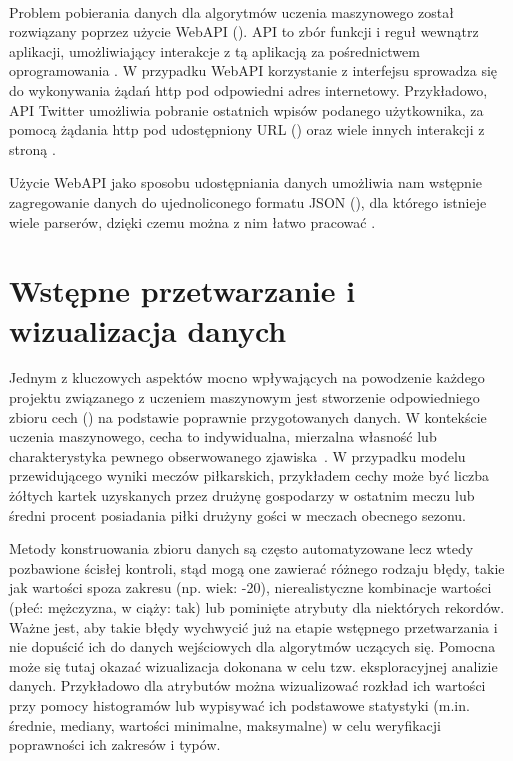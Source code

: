 ~

Problem pobierania danych dla algorytmów uczenia maszynowego został rozwiązany poprzez użycie WebAPI (). API to zbór funkcji i reguł wewnątrz aplikacji, umożliwiający interakcje z tą aplikacją za pośrednictwem oprogramowania \cite{webAPI_Mozzila}. W przypadku WebAPI korzystanie z interfejsu sprowadza się do wykonywania żądań http pod odpowiedni adres internetowy. Przykładowo, API Twitter umożliwia pobranie ostatnich wpisów podanego użytkownika, za pomocą żądania http pod udostępniony URL () oraz wiele innych interakcji z stroną \cite{Twitter_API}.

Użycie WebAPI jako sposobu udostępniania danych umożliwia nam wstępnie zagregowanie danych do ujednoliconego formatu JSON (), dla którego istnieje wiele parserów, dzięki czemu można z nim łatwo pracować \cite{JsonParserPython}.

\section{Wstępne przetwarzanie i wizualizacja danych}

\noindent 

Jednym z kluczowych aspektów mocno wpływających na powodzenie każdego projektu związanego z uczeniem maszynowym jest stworzenie odpowiedniego zbioru cech () na podstawie poprawnie przygotowanych danych. W kontekście uczenia maszynowego, cecha to indywidualna, mierzalna własność lub charakterystyka pewnego obserwowanego zjawiska~\cite{Wiki:Feature}. W przypadku modelu przewidującego wyniki meczów piłkarskich, przykładem cechy może być liczba żółtych kartek uzyskanych przez drużynę gospodarzy w ostatnim meczu lub średni procent posiadania piłki drużyny gości w meczach obecnego sezonu.

Metody konstruowania zbioru danych są często automatyzowane lecz wtedy  pozbawione ścisłej kontroli, stąd mogą one zawierać różnego rodzaju błędy, takie jak wartości spoza zakresu (np. wiek: -20), nierealistyczne kombinacje wartości (płeć: mężczyzna, w ciąży: tak) lub pominięte atrybuty dla niektórych rekordów. Ważne jest, aby takie błędy wychwycić już na etapie wstępnego przetwarzania i nie dopuścić ich do danych wejściowych dla algorytmów uczących się. Pomocna może się tutaj okazać wizualizacja dokonana w celu tzw. eksploracyjnej analizie danych. Przykładowo dla atrybutów można wizualizować rozkład ich wartości przy pomocy histogramów lub wypisywać ich podstawowe statystyki (m.in. średnie, mediany, wartości minimalne, maksymalne) w celu weryfikacji poprawności ich zakresów i typów.

